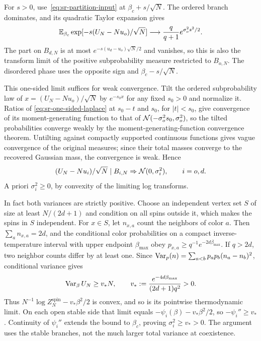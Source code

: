For $s>0$, use~\eqref{eq:sr-partition-input} at
$\beta_c+s/\sqrt N$. The ordered branch dominates, and its quadratic
Taylor expansion gives
\begin{equation}
 \mathbb E_{\beta_c}\exp[-s(U_N-Nu_o)/\sqrt N]
       \longrightarrow\frac q{q+1}e^{\sigma_o^2s^2/2}.
 \label{eq:sr-one-sided-laplace}
\end{equation}
The part on $B_{d,N}$ is at most
$e^{-s(u_d-u_o)\sqrt N/2}$ and vanishes, so this is also the transform
limit of the positive subprobability measure restricted to $B_{o,N}$.
The disordered phase uses the opposite sign and $\beta_c-s/\sqrt N$.

This one-sided limit suffices for weak convergence. Tilt the ordered
subprobability law of $x=(U_N-Nu_o)/\sqrt N$ by
$e^{-s_0x}$ for any fixed $s_0>0$ and normalize it. Ratios of
\eqref{eq:sr-one-sided-laplace} at $s_0-t$ and $s_0$, for $|t|<s_0$,
give convergence of its moment-generating function to that of
$\mathcal N(-\sigma_o^2s_0,\sigma_o^2)$, so the tilted probabilities
converge weakly by the moment-generating-function convergence theorem.
Untilting against compactly supported continuous functions gives vague
convergence of the original measures; since their total masses converge
to the recovered Gaussian mass, the convergence is weak. Hence
\begin{equation}
 (U_N-Nu_i)/\sqrt N\mid B_{i,N}
       \Rightarrow\mathcal N(0,\sigma_i^2),\qquad i=o,d.
 \label{eq:sr-conditional-clt}
\end{equation}
A priori $\sigma_i^2\ge0$, by convexity of the limiting log transforms.

In fact both variances are strictly positive. Choose an
independent vertex set $S$ of size at least $N/(2d+1)$ and condition on all spins
outside it, which makes the spins in $S$ independent. For $x\in S$,
let
$n_{x,a}$ count the neighbors of color $a$. Then
$\sum_a n_{x,a}=2d$, and the conditional color probabilities on a
compact inverse-temperature interval with upper endpoint $\beta_{\max}$
obey $p_{x,a}\ge q^{-1}e^{-2d\beta_{\max}}$. If $q>2d$, two neighbor
counts differ by at least one. Since
$\operatorname{Var}_p(n)=\sum_{a<b}p_ap_b(n_a-n_b)^2$, conditional variance gives
\begin{equation}
 \operatorname{Var}_\beta U_N\ge v_*N,\qquad
 v_*:=\frac{e^{-4d\beta_{\max}}}{(2d+1)q^2}>0.
 \label{eq:sr-variance-lower}
\end{equation}
Thus $N^{-1}\log Z_N^{\mathrm{spin}}-v_*\beta^2/2$ is convex, and so is
its pointwise thermodynamic limit. On each open stable
side that limit equals $-\psi_i(\beta)-v_*\beta^2/2$, so
$-\psi_i''\ge v_*$. Continuity of $\psi_i''$ extends the bound to
$\beta_c$, proving $\sigma_i^2\ge v_*>0$. The argument uses the
stable branches, not the much larger total variance at coexistence.

